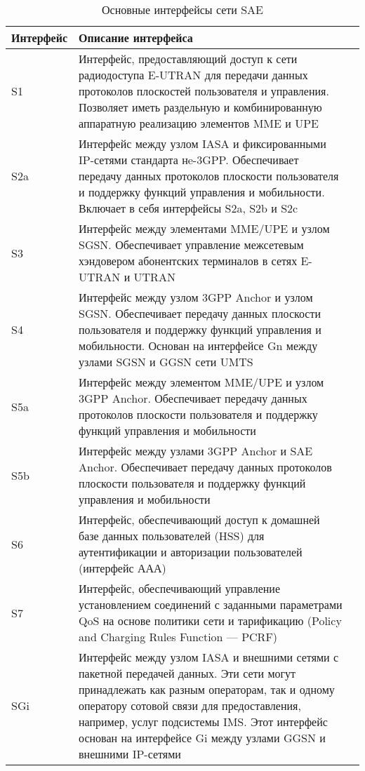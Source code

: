 \begin{table} [htbp]
  \centering
  \parbox{15cm}{\caption{Основные интерфейсы сети SAE}\label{SAEinterface}}
  \begin{tabular}[t]{| p{3cm} || p{12cm}l |}
  \hline
  \hline
  Интерфейс & \centering  Описание интерфейса & \\
  \hline
  \hline
  S1 & \centering  Интерфейс, предоставляющий доступ к сети радиодоступа E-UTRAN для передачи данных протоколов плоскостей пользователя и управления. Позволяет иметь раздельную и комбинированную аппаратную реализацию элементов MME и UPE & \\
  \hline
  S2a & \centering Интерфейс между узлом IASA и фиксированными IP-сетями стандарта нe-3GPP. Обеспечивает передачу данных протоколов плоскости пользователя и поддержку функций управления и мобильности. Включает в себя интерфейсы S2a, S2b и S2c & \\
  \hline
  S3 & \centering Интерфейс между элементами MME/UPE и узлом SGSN. Обеспечивает управление межсетевым хэндовером абонентских терминалов в сетях E-UTRAN и UTRAN  & \\
  \hline
  S4 & \centering Интерфейс между узлом 3GPP Anchor и узлом SGSN. Обеспечивает передачу данных плоскости пользователя и поддержку функций управления и мобильности. Основан на интерфейсе Gn между узлами SGSN и GGSN сети UMTS  & \\
  \hline
  S5a & \centering Интерфейс между элементом MME/UPE и узлом 3GPP Anchor. Обеспечивает передачу данных протоколов плоскости пользователя и поддержку функций управления и мобильности  & \\
  \hline
  S5b & \centering Интерфейс между узлами 3GPP Anchor и SAE Anchor. Обеспечивает передачу данных протоколов плоскости пользователя и поддержку функций управления и мобильности   & \\
  \hline
  S6 & \centering Интерфейс, обеспечивающий доступ к домашней базе данных пользователей (HSS) для аутентификации и авторизации пользователей (интерфейс ААА) & \\
  \hline
  S7 & \centering Интерфейс, обеспечивающий управление установлением соединений с заданными параметрами QoS на основе политики сети и тарификацию (Policy and Charging Rules Function — PCRF)    & \\
  \hline
  SGi & \centering Интерфейс между узлом IASA и внешними сетями с пакетной передачей данных. Эти сети могут принадлежать как разным операторам, так и одному оператору сотовой связи для предоставления, например, услуг подсистемы IMS. Этот интерфейс основан на интерфейсе Gi между узлами GGSN и внешними IP-сетями  & \\
  \hline
  \hline
  \end{tabular}
\end{table}









